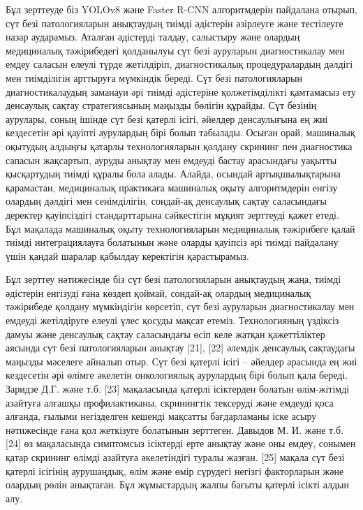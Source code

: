 Бұл зерттеуде біз YOLOv8 және Faster R-CNN алгоритмдерін пайдалана
отырып, сүт безі патологияларын анықтаудың тиімді әдістерін әзірлеуге
және тестілеуге назар аударамыз. Аталған әдістерді талдау, салыстыру
және олардың медициналық тәжірибедегі қолданылуы сүт безі ауруларын
диагностикалау мен емдеу саласын елеулі түрде жетілдіріп, диагностикалық
процедуралардың дәлдігі мен тиімділігін арттыруға мүмкіндік береді. Сүт
безі патологияларын диагностикалаудың заманауи әрі тиімді әдістеріне
қолжетімділікті қамтамасыз ету денсаулық сақтау стратегиясының маңызды
бөлігін құрайды. Сүт безінің аурулары, соның ішінде сүт безі қатерлі
ісігі, әйелдер денсаулығына ең жиі кездесетін әрі қауіпті аурулардың
бірі болып табылады. Осыған орай, машиналық оқытудың алдыңғы қатарлы
технологияларын қолдану скрининг пен диагностика сапасын жақсартып,
ауруды анықтау мен емдеуді бастау арасындағы уақытты қысқартудың тиімді
құралы бола алады. Алайда, осындай артықшылықтарына қарамастан,
медициналық практикаға машиналық оқыту алгоритмдерін енгізу олардың
дәлдігі мен сенімділігін, сондай-ақ денсаулық сақтау саласындағы
деректер қауіпсіздігі стандарттарына сәйкестігін мұқият зерттеуді қажет
етеді. Бұл мақалада машиналық оқыту технологияларын медициналық
тәжірибеге қалай тиімді интеграциялауға болатынын және оларды қауіпсіз
әрі тиімді пайдалану үшін қандай шаралар қабылдау керектігін
қарастырамыз.

Бұл зерттеу нәтижесінде біз сүт безі патологияларын анықтаудың жаңа,
тиімді әдістерін енгізуді ғана көздеп қоймай, сондай-ақ олардың
медициналық тәжірибеде қолдану мүмкіндігін көрсетіп, сүт безі ауруларын
диагностикалау мен емдеуді жетілдіруге елеулі үлес қосуды мақсат етеміз.
Технологияның үздіксіз дамуы және денсаулық сақтау саласындағы өсіп келе
жатқан қажеттіліктер аясында сүт безі патологияларын анықтау {[}21{]},
{[}22{]} әлемдік денсаулық сақтаудағы маңызды мәселеге айналып отыр. Сүт
безі қатерлі ісігі -- әйелдер арасында ең жиі кездесетін әрі өлімге
әкелетін онкологиялық аурулардың бірі болып қала береді. Заридзе Д.Г.
және т.б. {[}23{]} мақаласында қатерлі ісіктерден болатын өлім-жітімді
азайтуға алғашқы профилактиканы, скринингтік тексеруді және емдеуді қоса
алғанда, ғылыми негізделген кешенді мақсатты бағдарламаны іске асыру
нәтижесінде ғана қол жеткізуге болатынын зерттеген. Давыдов М. И. және
т.б. {[}24{]} өз мақаласында симптомсыз ісіктерді ерте анықтау және оны
емдеу, сонымен қатар скрининг өлімді азайтуға әкелетіндігі туралы
жазған. {[}25{]} мақала сүт безі қатерлі ісігінің аурушаңдық, өлім және
өмір сүрудегі негізгі факторларын және олардың рөлін анықтаған. Бұл
жұмыстардың жалпы бағыты қатерлі ісікті алдын алу.

